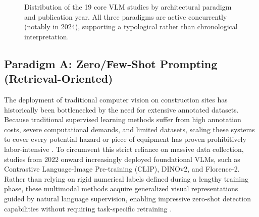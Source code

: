 \documentclass[10pt,letterpaper]{article}
\begin{document}
\begin{figure}[H]
\caption{Distribution of the 19 core VLM studies by architectural paradigm and publication year. All three paradigms are active concurrently (notably in 2024), supporting a typological rather than chronological interpretation.}
\label{fig:paradigmyear}
\centering
{}
\end{figure}

\subsection{Paradigm A: Zero/Few-Shot Prompting (Retrieval-Oriented)}

The deployment of traditional computer vision on construction sites has historically been bottlenecked by the need for extensive annotated datasets. Because traditional supervised learning methods suffer from high annotation costs, severe computational demands, and limited datasets, scaling these systems to cover every potential hazard or piece of equipment has proven prohibitively labor-intensive \cite{zhang2025}. To circumvent this strict reliance on massive data collection, studies from 2022 onward increasingly deployed foundational VLMs, such as Contrastive Language-Image Pre-training (CLIP), DINOv2, and Florence-2. Rather than relying on rigid numerical labels defined during a lengthy training phase, these multimodal methods acquire generalized visual representations guided by natural language supervision, enabling impressive zero-shot detection capabilities without requiring task-specific retraining \cite{zhang2025}.
\end{document}
